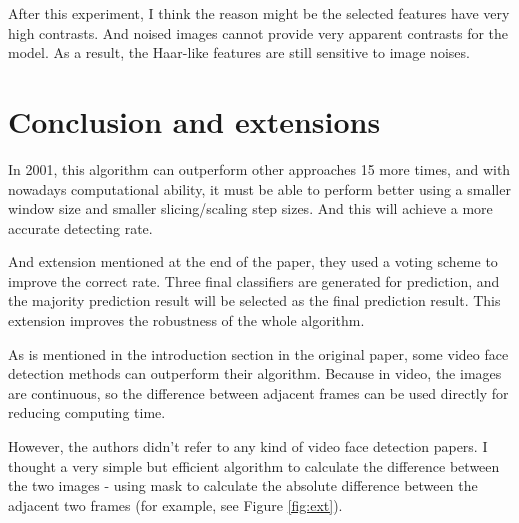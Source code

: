 \documentclass[10pt,twocolumn,letterpaper]{article}
\begin{document}
After this experiment, I think the reason might be the selected features have very high contrasts.
And noised images cannot provide very apparent contrasts for the model.
As a result, the Haar-like features are still sensitive to image noises.


\section{Conclusion and extensions}
In 2001, this algorithm can outperform other approaches 15 more times, and with nowadays computational ability,
it must be able to perform better using a smaller window size and smaller slicing/scaling step sizes.
And this will achieve a more accurate detecting rate.

And extension mentioned at the end of the paper, they used a voting scheme to improve the correct rate.
Three final classifiers are generated for prediction, and the majority prediction result will be selected as the final prediction result.
This extension improves the robustness of the whole algorithm.

As is mentioned in the introduction section in the original paper, some video face detection methods can outperform their algorithm.
Because in video, the images are continuous, so the difference between adjacent frames can be used directly for reducing computing time.

However, the authors didn't refer to any kind of video face detection papers.
I thought a very simple but efficient algorithm to calculate the difference between the two images - using mask to
calculate the absolute difference between the adjacent two frames (for example, see Figure \ref{fig:ext}).
\end{document}
